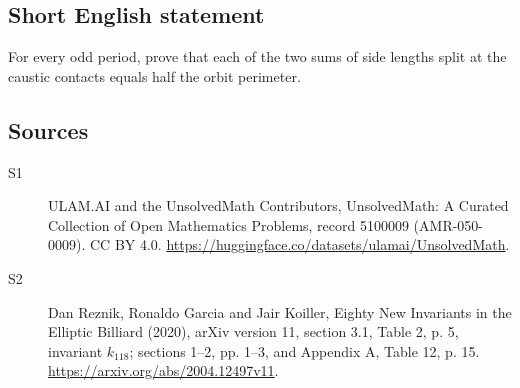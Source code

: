 \documentclass[11pt]{article}
\begin{document}
\subsection{Short English statement}
For every odd period, prove that each of the two sums of side lengths split at the caustic contacts equals half the orbit perimeter.
\subsection{Sources}
\begin{description}
\item[\hypertarget{source:5100009:1}{S1}] ULAM.AI and the UnsolvedMath Contributors, UnsolvedMath: A Curated Collection of Open Mathematics Problems, record 5100009 (AMR-050-0009). CC BY 4.0. \url{https://huggingface.co/datasets/ulamai/UnsolvedMath}.
\item[\hypertarget{source:5100009:2}{S2}] Dan Reznik, Ronaldo Garcia and Jair Koiller, Eighty New Invariants in the Elliptic Billiard (2020), arXiv version 11, section 3.1, Table 2, p. 5, invariant $k_{118}$; sections 1--2, pp. 1--3, and Appendix A, Table 12, p. 15. \url{https://arxiv.org/abs/2004.12497v11}.
\end{description}
\label{end:5100009}
\end{document}
